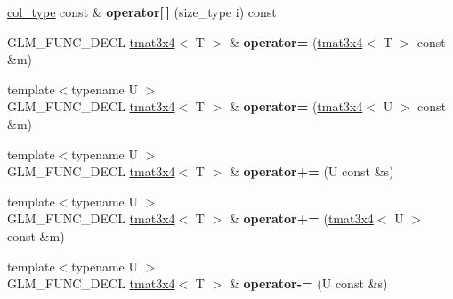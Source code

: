 \begin{DoxyCompactItemize}
\item 
\hypertarget{structglm_1_1detail_1_1tmat3x4_a7dc21a8cdc3498009633e48e4b97a103}{\hyperlink{structglm_1_1detail_1_1tvec4}{col\-\_\-type} const \& {\bfseries operator\mbox{[}$\,$\mbox{]}} (size\-\_\-type i) const }\label{structglm_1_1detail_1_1tmat3x4_a7dc21a8cdc3498009633e48e4b97a103}

\item 
\hypertarget{structglm_1_1detail_1_1tmat3x4_af9f94eb464f772e0a67f29e87bb70fd4}{\-G\-L\-M\-\_\-\-F\-U\-N\-C\-\_\-\-D\-E\-C\-L \hyperlink{structglm_1_1detail_1_1tmat3x4}{tmat3x4}$<$ \-T $>$ \& {\bfseries operator=} (\hyperlink{structglm_1_1detail_1_1tmat3x4}{tmat3x4}$<$ \-T $>$ const \&m)}\label{structglm_1_1detail_1_1tmat3x4_af9f94eb464f772e0a67f29e87bb70fd4}

\item 
\hypertarget{structglm_1_1detail_1_1tmat3x4_a7df8acdf83e6d3be3772293c85df6679}{{\footnotesize template$<$typename U $>$ }\\\-G\-L\-M\-\_\-\-F\-U\-N\-C\-\_\-\-D\-E\-C\-L \hyperlink{structglm_1_1detail_1_1tmat3x4}{tmat3x4}$<$ \-T $>$ \& {\bfseries operator=} (\hyperlink{structglm_1_1detail_1_1tmat3x4}{tmat3x4}$<$ \-U $>$ const \&m)}\label{structglm_1_1detail_1_1tmat3x4_a7df8acdf83e6d3be3772293c85df6679}

\item 
\hypertarget{structglm_1_1detail_1_1tmat3x4_afa83fc381ca28004689a7994cd4ad627}{{\footnotesize template$<$typename U $>$ }\\\-G\-L\-M\-\_\-\-F\-U\-N\-C\-\_\-\-D\-E\-C\-L \hyperlink{structglm_1_1detail_1_1tmat3x4}{tmat3x4}$<$ \-T $>$ \& {\bfseries operator+=} (\-U const \&s)}\label{structglm_1_1detail_1_1tmat3x4_afa83fc381ca28004689a7994cd4ad627}

\item 
\hypertarget{structglm_1_1detail_1_1tmat3x4_a104a2499dfa0fc5444841a6ba36e5e32}{{\footnotesize template$<$typename U $>$ }\\\-G\-L\-M\-\_\-\-F\-U\-N\-C\-\_\-\-D\-E\-C\-L \hyperlink{structglm_1_1detail_1_1tmat3x4}{tmat3x4}$<$ \-T $>$ \& {\bfseries operator+=} (\hyperlink{structglm_1_1detail_1_1tmat3x4}{tmat3x4}$<$ \-U $>$ const \&m)}\label{structglm_1_1detail_1_1tmat3x4_a104a2499dfa0fc5444841a6ba36e5e32}

\item 
\hypertarget{structglm_1_1detail_1_1tmat3x4_a60e2bfd1c7253bb40c0610c465d27ef6}{{\footnotesize template$<$typename U $>$ }\\\-G\-L\-M\-\_\-\-F\-U\-N\-C\-\_\-\-D\-E\-C\-L \hyperlink{structglm_1_1detail_1_1tmat3x4}{tmat3x4}$<$ \-T $>$ \& {\bfseries operator-\/=} (\-U const \&s)}\label{structglm_1_1detail_1_1tmat3x4_a60e2bfd1c7253bb40c0610c465d27ef6}


\end{DoxyCompactItemize}
